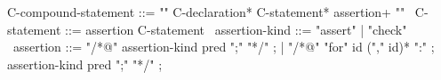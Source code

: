 \begin{syntax}
  C-compound-statement ::= "{" C-declaration* C-statement* assertion+ "}"
        \
  C-statement ::= assertion C-statement \
  assertion-kind ::= "assert" | "check" \
  assertion ::= "/*@" assertion-kind pred ";" "*/" ;
  | "/*@" "for" id ("," id)* ":" ;
      assertion-kind pred ";" "*/" ;
\end{syntax}
